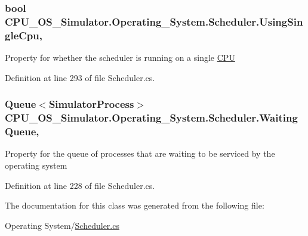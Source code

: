\subsubsection[{Using\+Single\+Cpu}]{\setlength{\rightskip}{0pt plus 5cm}bool C\+P\+U\+\_\+\+O\+S\+\_\+\+Simulator.\+Operating\+\_\+\+System.\+Scheduler.\+Using\+Single\+Cpu\hspace{0.3cm}{\ttfamily [get]}, {\ttfamily [set]}}\label{class_c_p_u___o_s___simulator_1_1_operating___system_1_1_scheduler_a3637999160bc25da430731042f42dd81}


Property for whether the scheduler is running on a single \hyperlink{namespace_c_p_u___o_s___simulator_1_1_c_p_u}{C\+P\+U} 



Definition at line 293 of file Scheduler.\+cs.

\hypertarget{class_c_p_u___o_s___simulator_1_1_operating___system_1_1_scheduler_aac41827d1eff5710d0a9b5ea664dd99f}{}
\subsubsection[{Waiting\+Queue}]{\setlength{\rightskip}{0pt plus 5cm}Queue$<${\bf Simulator\+Process}$>$ C\+P\+U\+\_\+\+O\+S\+\_\+\+Simulator.\+Operating\+\_\+\+System.\+Scheduler.\+Waiting\+Queue\hspace{0.3cm}{\ttfamily [get]}, {\ttfamily [set]}}\label{class_c_p_u___o_s___simulator_1_1_operating___system_1_1_scheduler_aac41827d1eff5710d0a9b5ea664dd99f}


Property for the queue of processes that are waiting to be serviced by the operating system 



Definition at line 228 of file Scheduler.\+cs.



The documentation for this class was generated from the following file\+:\begin{DoxyCompactItemize}
\item 
Operating System/\hyperlink{_scheduler_8cs}{Scheduler.\+cs}\end{DoxyCompactItemize}
